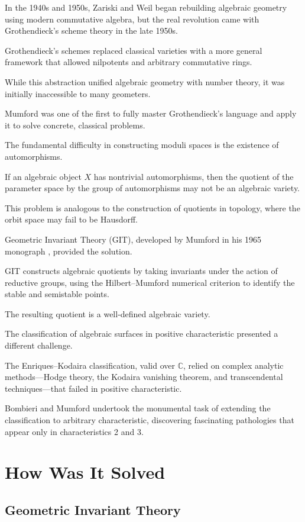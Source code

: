 In the 1940s and 1950s, Zariski and Weil began rebuilding algebraic geometry using modern commutative algebra, but the real revolution came with Grothendieck's scheme theory in the late 1950s.

Grothendieck's schemes replaced classical varieties with a more general framework that allowed nilpotents and arbitrary commutative rings.

While this abstraction unified algebraic geometry with number theory, it was initially inaccessible to many geometers.

Mumford was one of the first to fully master Grothendieck's language and apply it to solve concrete, classical problems.

The fundamental difficulty in constructing moduli spaces is the existence of automorphisms.

If an algebraic object $X$ has nontrivial automorphisms, then the quotient of the parameter space by the group of automorphisms may not be an algebraic variety.

This problem is analogous to the construction of quotients in topology, where the orbit space may fail to be Hausdorff.

Geometric Invariant Theory (GIT), developed by Mumford in his 1965 monograph \cite{mumford1965}, provided the solution.

GIT constructs algebraic quotients by taking invariants under the action of reductive groups, using the Hilbert--Mumford numerical criterion to identify the stable and semistable points.

The resulting quotient is a well-defined algebraic variety.

The classification of algebraic surfaces in positive characteristic presented a different challenge.

The Enriques--Kodaira classification, valid over $\mathbb{C}$, relied on complex analytic methods---Hodge theory, the Kodaira vanishing theorem, and transcendental techniques---that failed in positive characteristic.

Bombieri and Mumford undertook the monumental task of extending the classification to arbitrary characteristic, discovering fascinating pathologies that appear only in characteristics 2 and 3.

\section{How Was It Solved}

\subsection{Geometric Invariant Theory}


